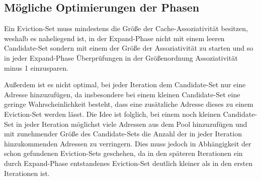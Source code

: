 




\subsection{Mögliche Optimierungen der Phasen}
\label{optESSearch}

Ein Eviction-Set muss mindestens die Größe der Cache-Assoziativität besitzen, weshalb es naheliegend ist, in der Expand-Phase nicht mit einem leeren Candidate-Set sondern mit einem der Größe der Assoziativität zu starten und so in jeder Expand-Phase Überprüfungen in der Größenordnung Assoziativität minus 1 einzusparen.

Außerdem ist es nicht optimal, bei jeder Iteration dem Candidate-Set nur eine Adresse hinzuzufügen, da insbesondere bei einem kleinen Candidate-Set eine geringe Wahrscheinlichkeit besteht, dass eine zusätzliche Adresse dieses zu einem Eviction-Set werden lässt.
Die Idee ist folglich, bei einem noch kleinen Candidate-Set in jeder Iteration möglichst viele Adressen aus dem Pool hinzuzufügen und mit zunehmender Größe des Candidate-Sets die Anzahl der in jeder Iteration hinzukommenden Adressen zu verringern.
Dies muss jedoch in Abhängigkeit der schon gefundenen Eviction-Sets geschehen, da in den späteren Iterationen ein durch Expand-Phase entstandenes Eviction-Set deutlich kleiner als in den ersten Iterationen ist.

